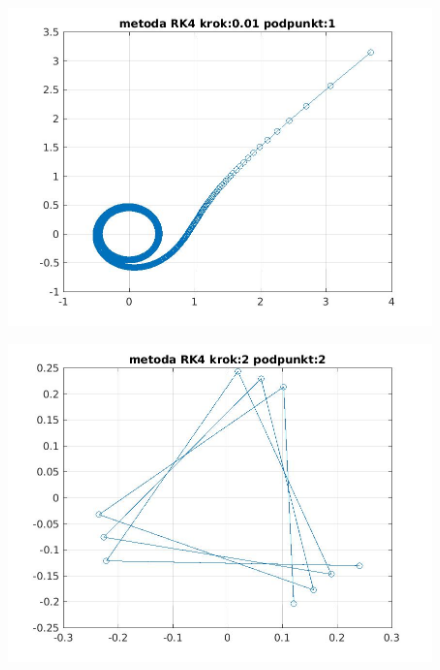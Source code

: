 \documentclass[a4paper, 11pt]{article}
\begin{document}
\begin{figure}[H]
\centering
\includegraphics[width = 15cm]{2d/metoda RK4 krok:0,01 podpunkt:1.jpg}
\end{figure}

\begin{figure}[H]
\centering
\includegraphics[width = 15cm]{2d/metoda RK4 krok:2 podpunkt:2.jpg}
\end{figure}
\end{document}
